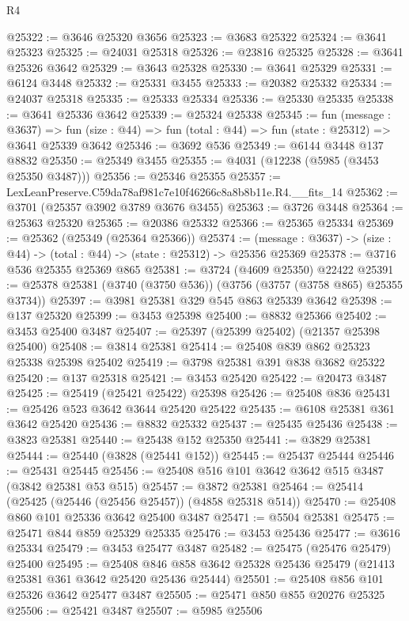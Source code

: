 \begin{lexlean}{R4}
\begin{coremodule}
@25322 := @3646 @25320 @3656
@25323 := @3683 @25322
@25324 := @3641 @25323
@25325 := @24031 @25318
@25326 := @23816 @25325
@25328 := @3641 @25326 @3642
@25329 := @3643 @25328
@25330 := @3641 @25329
@25331 := @6124 @3448
@25332 := @25331 @3455
@25333 := @20382 @25332
@25334 := @24037 @25318
@25335 := @25333 @25334
@25336 := @25330 @25335
@25338 := @3641 @25336 @3642
@25339 := @25324 @25338
@25345 := fun (message : @3637) =>
  fun (size : @44) => fun (total : @44) => fun (state : @25312) => @3641 @25339 @3642
@25346 := @3692 @536
@25349 := @6144 @3448 @137 @8832
@25350 := @25349 @3455
@25355 := @4031 (@12238 (@5985 (@3453 @25350 @3487)))
@25356 := @25346 @25355
@25357 := LexLeanPreserve.C59da78af981c7e10f46266c8a8b8b11e.R4.__fits_14
@25362 := @3701 (@25357 @3902 @3789 @3676 @3455)
@25363 := @3726 @3448
@25364 := @25363 @25320
@25365 := @20386 @25332
@25366 := @25365 @25334
@25369 := @25362 (@25349 (@25364 @25366))
@25374 := (message : @3637) -> (size : @44) -> (total : @44) -> (state : @25312) -> @25356 @25369
@25378 := @3716 @536 @25355 @25369 @865
@25381 := @3724 (@4609 @25350) @22422
@25391 := @25378 @25381 (@3740 (@3750 @536)) (@3756 (@3757 (@3758 @865) @25355 @3734))
@25397 := @3981 @25381 @329 @545 @863 @25339 @3642
@25398 := @137 @25320
@25399 := @3453 @25398
@25400 := @8832 @25366
@25402 := @3453 @25400 @3487
@25407 := @25397 (@25399 @25402) (@21357 @25398 @25400)
@25408 := @3814 @25381
@25414 := @25408 @839 @862 @25323 @25338 @25398 @25402
@25419 := @3798 @25381 @391 @838 @3682 @25322
@25420 := @137 @25318
@25421 := @3453 @25420
@25422 := @20473 @3487
@25425 := @25419 (@25421 @25422) @25398
@25426 := @25408 @836
@25431 := @25426 @523 @3642 @3644 @25420 @25422
@25435 := @6108 @25381 @361 @3642 @25420
@25436 := @8832 @25332
@25437 := @25435 @25436
@25438 := @3823 @25381
@25440 := @25438 @152 @25350
@25441 := @3829 @25381
@25444 := @25440 (@3828 (@25441 @152))
@25445 := @25437 @25444
@25446 := @25431 @25445
@25456 := @25408 @516 @101 @3642 @3642 @515 @3487 (@3842 @25381 @53 @515)
@25457 := @3872 @25381
@25464 := @25414 (@25425 (@25446 (@25456 @25457)) (@4858 @25318 @514))
@25470 := @25408 @860 @101 @25336 @3642 @25400 @3487
@25471 := @5504 @25381
@25475 := @25471 @844 @859 @25329 @25335
@25476 := @3453 @25436
@25477 := @3616 @25334
@25479 := @3453 @25477 @3487
@25482 := @25475 (@25476 @25479) @25400
@25495 := @25408
    @846
    @858
    @3642
    @25328
    @25436
    @25479
    (@21413 @25381 @361 @3642 @25420 @25436 @25444)
@25501 := @25408 @856 @101 @25326 @3642 @25477 @3487
@25505 := @25471 @850 @855 @20276 @25325
@25506 := @25421 @3487
@25507 := @5985 @25506

\end{coremodule}
\end{lexlean}
